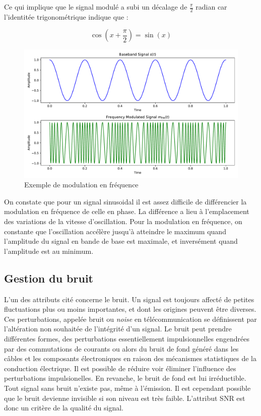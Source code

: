 Ce qui implique que le signal modulé a subi un décalage de $\frac{\pi}{2}$ radian car l'identitée trigonométrique indique que :

\begin{equation}\label{eq122}
\cos(x+\frac{\pi}{2}) = \sin(x)
\end{equation}

\begin{figure}[h]
\centering

\includegraphics[scale=0.5]{images/FM_MOD.pdf}
\caption{Exemple de modulation en fréquence}\label{term2}
\end{figure}



On constate que pour un signal sinusoidal il est assez difficile de différencier la modulation en fréquence de celle en phase. La différence a lieu à l'emplacement des variations de la vitesse d'oscillation. Pour la modulation en fréquence, on constante que l'oscillation accélère jusqu'à atteindre le maximum quand l'amplitude du signal en bande de base est maximale, et inversément quand l'amplitude est au minimum.


\subsection{Gestion du bruit}

L'un des attributs cité concerne le bruit. Un signal est toujours affecté de petites fluctuations plus ou moins importantes, et dont les origines peuvent être diverses. Ces perturbations, appelée bruit ou \textit{noise} en télécommunication se définissent par l'altération non souhaitée de l'intégrité d'un signal. Le bruit peut prendre différentes formes, des perturbations essentiellement impulsionnelles engendrées par des commutations de courants ou alors du bruit de fond généré dans les câbles et les composants électroniques en raison
des mécanismes statistiques de la conduction électrique. Il est possible de réduire voir éliminer l'influence des perturbations impulsionelles. En revanche, le bruit de fond est lui irréductible. Tout signal sans bruit n'existe pas, même à l'émission. Il est cependant possible que le bruit devienne invisible si son niveau est très faible. L'attribut SNR est donc un critère de la qualité du signal.


